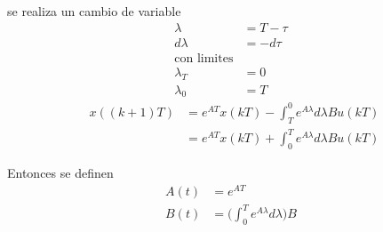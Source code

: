 se realiza un cambio de variable 
\[ 
    \begin{split}
        \lambda & = T - \tau \\
        d\lambda & = -d\tau \\
        \text{con limites} \\
        \lambda_{T} & = 0 \\
        \lambda_{0} & = T
    \end{split} 
\]
\[
    \begin{split}
        \;\; x((k+1)T) & = e^{AT}x(kT) - \int_{T}^{0} e^{A\lambda} d\lambda Bu(kT) \\
        & = e^{AT}x(kT) + \int_{0}^{T} e^{A\lambda} d\lambda Bu(kT)
    \end{split}
\]

Entonces se definen
\[
    \begin{split}
        A(t) & = e^{AT} \\
        B(t) & = \big( \int_{0}^{T} e^{A\lambda} d\lambda \big) B
    \end{split}
\]